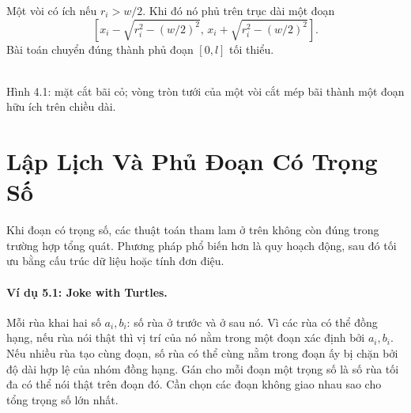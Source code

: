 \documentclass[11pt]{article}
\begin{document}
Một vòi có ích nếu \(r_i>w/2\). Khi đó nó phủ trên trục dài một đoạn
\[
  \left[x_i-\sqrt{r_i^2-(w/2)^2},\,
        x_i+\sqrt{r_i^2-(w/2)^2}\right].
\]
Bài toán chuyển đúng thành phủ đoạn \([0,l]\) tối thiểu.

\begin{center}
\\[-0.1em]
{\small Hình 4.1: mặt cắt bãi cỏ; vòng tròn tưới của một vòi cắt mép bãi thành
một đoạn hữu ích trên chiều dài.}
\end{center}

\section{Lập Lịch Và Phủ Đoạn Có Trọng Số}

Khi đoạn có trọng số, các thuật toán tham lam ở trên không còn đúng trong
trường hợp tổng quát. Phương pháp phổ biến hơn là quy hoạch động, sau đó tối
ưu bằng cấu trúc dữ liệu hoặc tính đơn điệu.

\paragraph{Ví dụ 5.1: Joke with Turtles.}
Mỗi rùa khai hai số \(a_i,b_i\): số rùa ở trước và ở sau nó. Vì các rùa có thể
đồng hạng, nếu rùa nói thật thì vị trí của nó nằm trong một đoạn xác định bởi
\(a_i,b_i\). Nếu nhiều rùa tạo cùng đoạn, số rùa có thể cùng nằm trong đoạn
ấy bị chặn bởi độ dài hợp lệ của nhóm đồng hạng. Gán cho mỗi đoạn một trọng số
là số rùa tối đa có thể nói thật trên đoạn đó. Cần chọn các đoạn không giao
nhau sao cho tổng trọng số lớn nhất.
\end{document}
